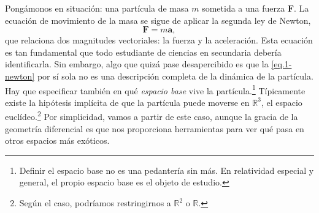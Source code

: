 Pongámonos en situación: una partícula de masa \(m\) sometida a una fuerza \(\mathbf{F}\). La ecuación de movimiento de la masa se sigue de aplicar la segunda ley de Newton,
\begin{equation}
    \label{eq.1-newton}
    \mathbf{F} = m\mathbf{a},
\end{equation}
que relaciona dos magnitudes vectoriales: la fuerza y la aceleración. Esta ecuación es tan fundamental que todo estudiante de ciencias en secundaria debería identificarla. Sin embargo, algo que quizá pase desapercibido es que la \cref{eq.1-newton} por sí sola no es una descripción completa de la dinámica de la partícula. Hay que especificar también en qué \textit{espacio base} vive la partícula.\footnote{Definir el espacio base no es una pedantería sin más. En relatividad especial y general, el propio espacio base es el objeto de estudio.} Típicamente existe la hipótesis implícita de que la partícula puede moverse en \(\mathbb{R}^3\), el espacio euclídeo.\footnote{Según el caso, podríamos restringirnos a \(\mathbb{R}^2\) o \(\mathbb{R}\).} Por simplicidad, vamos a partir de este caso, aunque la gracia de la geometría diferencial es que nos proporciona herramientas para ver qué pasa en otros espacios más exóticos. 

